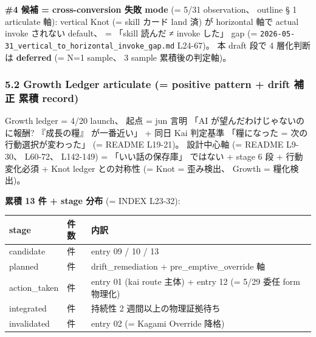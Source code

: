 \documentclass[
]{article}
\newcounter{none} %
\begin{document}
\textbf{\#4 候補 = cross-conversion 失敗 mode} (= 5/31 observation、
outline § 1 articulate 軸): vertical Knot (= skill カード land 済) が
horizontal 軸で actual invoke されない default、 = 「skill 読んだ ≠
invoke した」 gap (=
\texttt{2026-05-31\_vertical\_to\_horizontal\_invoke\_gap.md} L24-67)。
本 draft 段で 4 層化判断は \textbf{deferred} (= N=1 sample、 3 sample
累積後の判定軸)。

\subsubsection{5.2 Growth Ledger articulate (= positive pattern + drift
補正 累積
record)}\label{growth-ledger-articulate-positive-pattern-drift-ux88dcux6b63-ux7d2fux7a4d-record}

Growth ledger = 4/20 launch、 起点 = jun 言明 「AI
が望んだわけじゃないのに報酬? 『成長の糧』 が一番近い」 + 同日 Kai
判定基準 「糧になった = 次の行動選択が変わった」 (= README L19-21)。
設計中心軸 (= README L9-30、 L60-72、 L142-149) = 「いい話の保存庫」
ではない + stage 6 段 + 行動変化必須 + Knot ledger との対称性 (= Knot =
歪み検出、 Growth = 糧化検出)。

\textbf{累積 13 件 + stage 分布} (= INDEX L23-32):

{\def\LTcaptype{none} %
\begin{longtable}[]{@{}
  >{\raggedright\arraybackslash}p{}
  >{\raggedright\arraybackslash}p{}
  >{\raggedright\arraybackslash}p{}@{}}
\toprule\noalign{}
\begin{minipage}[b]{\linewidth}\raggedright
stage
\end{minipage} & \begin{minipage}[b]{\linewidth}\raggedright
件数
\end{minipage} & \begin{minipage}[b]{\linewidth}\raggedright
内訳
\end{minipage} \\
\midrule\noalign{}
\endhead
\bottomrule\noalign{}
\endlastfoot
candidate & 3 件 & entry 09 / 10 / 13 \\
planned & 8 件 & drift\_remediation + pre\_emptive\_override 軸 \\
action\_taken & 2 件 & entry 01 (kai route 主体) + entry 12 (= 5/29 委任
form 物理化) \\
integrated & 0 件 & 持続性 2 週間以上の物理証拠待ち \\
invalidated & 1 件 & entry 02 (= Kagami Override 降格) \\
\end{longtable}
}
\end{document}

